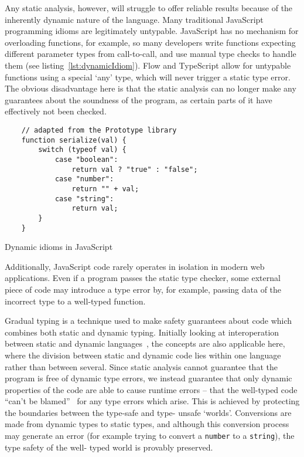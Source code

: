 \documentclass[12pt,a4paper,twoside,openright]{report}
\begin{document}
Any static analysis, however, will struggle to offer reliable results because
of the inherently dynamic nature of the language. Many traditional JavaScript
programming idioms are legitimately untypable. JavaScript has no
mechanism for overloading functions, for example, so many developers write
functions expecting different parameter types from call-to-call, and use manual
type checks to handle them (see listing~\ref{lst:dynamicIdiom}).  Flow and
TypeScript allow for untypable functions using a special `any' type, which will
never trigger a static type error. The obvious disadvantage here is that the
static analysis can no longer make any guarantees about the soundness of the
program, as certain parts of it have effectively not been checked.
\begin{program}[t]
  \begin{verbatim}
  	// adapted from the Prototype library
  	function serialize(val) {
	  	switch (typeof val) {
		  	case "boolean":
			  	return val ? "true" : "false";
		  	case "number":
			  	return "" + val;
		  	case "string":
			  	return val;
	  	}
  	}	
  \end{verbatim}
  \label{lst:dynamicIdiom}
  \caption{Dynamic idioms in JavaScript}
\end{program}
Additionally, JavaScript code rarely operates in isolation in modern web
applications. Even if a program passes the static type checker, some external
piece of code may introduce a type error by, for example, passing data of the
incorrect type to a well-typed function.

Gradual typing is a technique used to make safety guarantees about code which
combines both static and dynamic typing. Initially looking at interoperation
between static and dynamic languages~\cite{gray2005fine}, the concepts are
also applicable here, where the division between static and dynamic code lies
within one language rather than between several. Since static analysis cannot
guarantee that the program is free of dynamic type errors, we instead
guarantee that only dynamic properties of the code are able to cause runtime
errors -- that the well-typed code ``can't be blamed''~\cite{cantblame} for
any type errors which arise. This is achieved by protecting the boundaries
between the type-safe and type- unsafe `worlds'. Conversions are made from
dynamic types to static types, and although this conversion process may
generate an error (for example trying to convert a \texttt{number} to a
\texttt{string}), the type safety of the well- typed world is provably
preserved.
\end{document}
